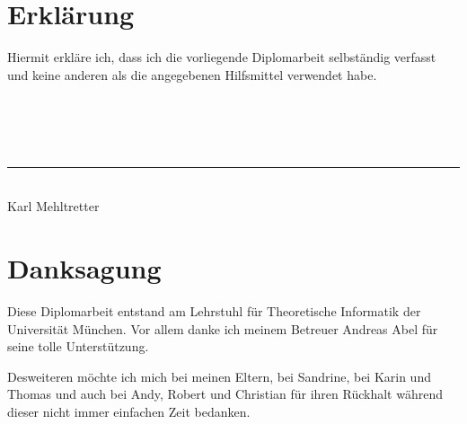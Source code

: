 \chapter*{Erkl\"arung}
Hiermit erkl\"are ich, dass ich die vorliegende Diplomarbeit selbst\"andig verfasst und keine anderen als die angegebenen Hilfsmittel verwendet habe.
\\
\\
\\
\\
\\
\rule{7cm}{0.4pt}\\
{\Large Karl Mehltretter}\\

\chapter*{Danksagung}
Diese Diplomarbeit entstand am Lehrstuhl f\"ur Theoretische Informatik der Universit\"at M\"unchen.
Vor allem danke ich meinem Betreuer Andreas Abel f\"ur seine tolle Unterst\"utzung.

Desweiteren m\"ochte ich mich bei meinen Eltern, bei Sandrine, bei Karin und Thomas und auch bei Andy, Robert und Christian f\"ur ihren R\"uckhalt w\"ahrend dieser nicht immer einfachen Zeit bedanken.
